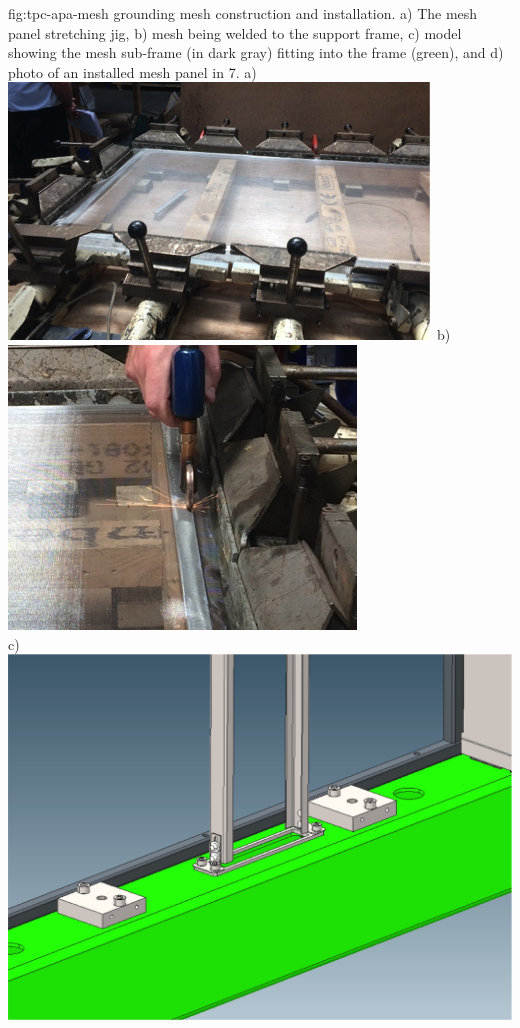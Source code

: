 \begin{dunefigure}{fig:tpc-apa-mesh}
{ grounding mesh construction and installation. a) The mesh panel stretching jig, b) mesh being welded to the support frame, c) model showing the mesh sub-frame (in dark gray) fitting into the  frame (green), and d) photo of an installed mesh panel in  7.}
\mbox{a) \includegraphics[height=0.23\textheight]{graphics/sp-apa-mesh-jig.png} \hspace{0.0mm}
b) \includegraphics[height=0.23\textheight]{graphics/sp-apa-mesh-weld.png}} \\
\vspace{3mm}
\hspace{0.4mm}
\mbox{c) \includegraphics[height=0.23\textheight]{graphics/sp-apa-mesh-install-design.png}
}
\end{dunefigure}

